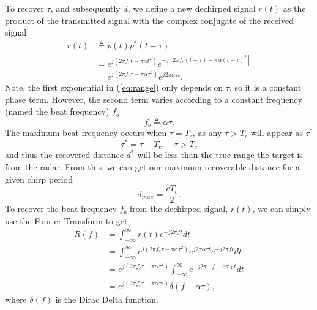 To recover $\tau$, and subsequently $d$, we define a new dechirped signal $r(t)$
as the product of the transmitted signal with the complex conjugate of the
received signal
\begin{align}
	r(t) &\triangleq p(t)p^*(t-\tau) \\
	&= e^{j(2\pi f_c t + \pi \alpha t^2)}e^{-j[2\pi f_c (t-\tau) + \pi\alpha (t-\tau)^2 ]} \\
	&= e^{j(2\pi f_c \tau - \pi \alpha \tau^2)}e^{j2\pi\alpha\tau t}.\label{eq:range}
\end{align}
Note, the first exponential in (\ref{eq:range}) only depends on $\tau$, so it is
a constant phase term. However, the second term varies according to a constant
frequency (named the beat frequency) $f_b$
\begin{equation}
	f_b \triangleq \alpha \tau.
\end{equation}
The maximum beat frequency occurs when $\tau = T_c$, as any $\tau > T_c$ will
appear as $\tau^*$
\begin{equation}
	\tau^* = \tau - T_c, \quad \tau > T_c
\end{equation}
and thus the recovered distance $d^*$ will be less than the true range the
target is from the radar. From this, we can get our maximum recoverable distance
for a given chirp period
\begin{equation}
	d_{max} = \frac{c T_c}{2}.
\end{equation}
To recover the beat frequency $f_b$ from the dechirped signal, $r(t)$, we can
simply use the Fourier Transform to get
\begin{align}
	R(f) &= \int_{-\infty}^{\infty} r(t) e^{-j2 \pi ft} dt\\
	&= \int_{-\infty}^{\infty} e^{j(2\pi f_c \tau - \pi \alpha \tau^2)}e^{j2\pi\alpha\tau t} e^{-j2\pi ft}dt\\
	&= e^{j(2\pi f_c \tau - \pi \alpha
	\tau^2)}\int_{-\infty}^{\infty}e^{-j2\pi(f - \alpha\tau ) t} dt\\
	&= e^{j(2\pi f_c \tau - \pi \alpha \tau^2)}\delta (f - \alpha \tau),
\end{align}
where $\delta(f)$ is the Dirac Delta function.



